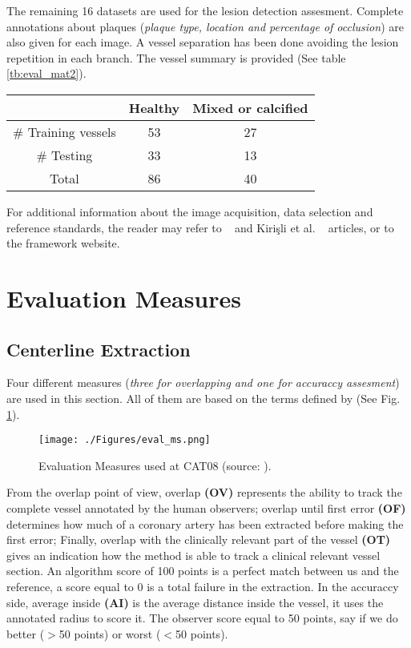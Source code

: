 The remaining 16 datasets are used for the lesion detection assesment. Complete annotations about plaques (\textit{plaque type, location and percentage of occlusion}) are also given for each image. A vessel separation has been done avoiding the lesion repetition in each branch. The vessel summary is provided (See table \ref{tb:eval_mat2}).

\begin{table*}
\scriptsize
\caption{Vessels summary}
\centering
\begin{tabular}{|c|c|c|}
\hline
\multicolumn{1}{|c|}{} &\multicolumn{1}{c|}{\textbf{Healthy}} &\multicolumn{1}{c|}{\textbf{Mixed or calcified}}\\
\hline
\# Training vessels &53 &27\\
\# Testing &33&13\\
\hline
Total &86&40 \\
\hline
\end{tabular}
\vspace{-0.3cm}
\label{tb:eval_mat2}
\normalsize
\end{table*}

For additional information about the image acquisition, data selection and reference standards, the reader may refer to ~\citep{Schaap2009} and Kirişli et al. ~\citep{Kirisli2013} articles, or to the framework website.

\section{Evaluation Measures}\label{eval:Measures}

\subsection{Centerline Extraction}
Four different measures (\textit{three for overlapping and one for accuraccy assesment}) are used in this section. All of them are based on the terms defined by \citep{Schaap2009} (See Fig. \ref{fig:exp3_ms}).

\begin{figure}[htbp]
	\centering
		\texttt{[image: ./Figures/eval\_ms.png]}
	\caption[Coronary Centerline Evaluation Measures CAT08]{Evaluation Measures used at CAT08 (source: \citep{Schaap2009}).}
	\label{fig:exp3_ms}
\end{figure}

From the overlap point of view, overlap \textbf{(OV)} represents the ability to track the complete vessel annotated by the human observers; overlap until first error \textbf{(OF)} determines how much of a coronary artery has been extracted before making the first error; Finally, overlap with the clinically relevant part of the vessel \textbf{(OT)} gives an indication how the method is able to track a clinical relevant vessel section. An algorithm score of 100 points is a perfect match between us and the reference, a score equal to 0 is a total failure in the extraction. In the accuraccy side, average inside \textbf{(AI)} is the average distance inside the vessel, it uses the annotated radius to score it. The observer score equal to 50 points, say if we do better ($>$50 points) or worst ($<$50 points).

